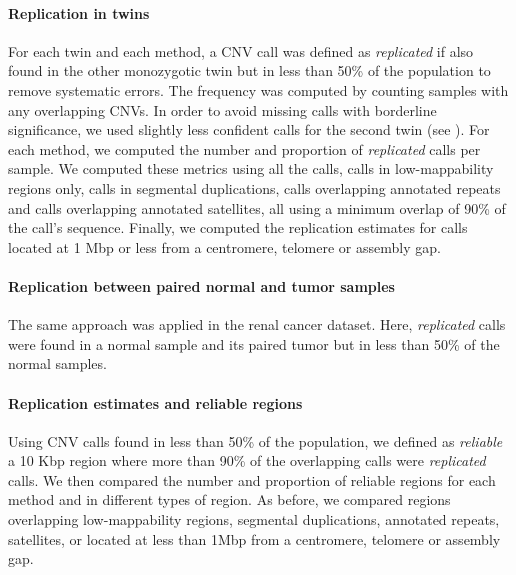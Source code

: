 \paragraph{Replication in twins}
For each twin and each method, a CNV call was defined as {\it replicated} if also found in the other monozygotic twin but in less than 50\% of the population to remove systematic errors.
The frequency was computed by counting samples with any overlapping CNVs.
In order to avoid missing calls with borderline significance, we used slightly less confident calls for the second twin (see ).
For each method, we computed the number and proportion of {\it replicated} calls per sample.
We computed these metrics using all the calls, calls in low-mappability regions only, calls in segmental duplications, calls overlapping annotated repeats and calls overlapping annotated satellites, all using a minimum overlap of 90\% of the call's sequence.
Finally, we computed the replication estimates for calls located at 1 Mbp or less from a centromere, telomere or assembly gap.

\paragraph{Replication between paired normal and tumor samples}
The same approach was applied in the renal cancer dataset.
Here, {\it replicated} calls were found in a normal sample and its paired tumor but in less than 50\% of the normal samples.

\paragraph{Replication estimates and reliable regions}
Using CNV calls found in less than 50\% of the population, we defined as {\it reliable} a 10 Kbp region where more than 90\% of the overlapping calls were {\it replicated} calls.
We then compared the number and proportion of reliable regions for each method and in different types of region.
As before, we compared regions overlapping low-mappability regions, segmental duplications, annotated repeats, satellites, or located at less than 1Mbp from a centromere, telomere or assembly gap.

